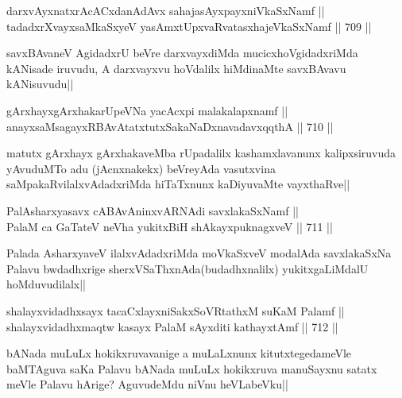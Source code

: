 \begin{shl}
darxvAyxnatxrAcACxdanAdAvx sahajasAyxpayxniVkaSxNamf || \\
tadadxrXvayxsaMkaSxyeV yasAmxtUpxvaRvatasxhajeVkaSxNamf ||  709 ||  
\end{shl}

\begin{artha}
savxBAvaneV AgidadxrU beVre darxvayxdiMda mucicxhoVgidadxriMda kANisade iruvudu, A darxvayxvu hoVdalilx hiMdinaMte savxBAvavu kANisuvudu||
\end{artha}


\begin{shl}
gArxhayxgArxhakarUpeVNa yacAcxpi malakalapxnamf || \\
anayxsaMsagayxRBAvAtatxtutxSakaNaDxnavadavxqqthA ||  710 ||  
\end{shl}

\begin{artha}
matutx gArxhayx gArxhakaveMba rUpadalilx kashamxlavanunx kalipxsiruvuda yAvuduMTo adu (jAcnxnakekx) beVreyAda vasutxvina saMpakaRvilalxvAdadxriMda hiTaTxnunx kaDiyuvaMte vayxthaRve||
\end{artha}


\begin{shl}
PalAsharxyasavx cABAvAninxvARNAdi savxlakaSxNamf || \\
PalaM ca GaTateV neVha yukitxBiH shAkayxpuknagxveV ||  711 ||  
\end{shl}

\begin{artha}
Palada AsharxyaveV ilalxvAdadxriMda moVkaSxveV modalAda savxlakaSxNa Palavu bwdadhxrige sherxVSaThxnAda(budadhxnalilx) yukitxgaLiMdalU hoMduvudilalx||
\end{artha}


\begin{shl}
shalayxvidadhxsayx tacaCxlayxniSakxSoVRtathxM suKaM Palamf || \\
shalayxvidadhxmaqtw kasayx PalaM sAyxditi kathayxtAmf ||  712 ||  
\end{shl}

\begin{artha}
bANada muLuLx hokikxruvavanige a muLaLxnunx kitutxtegedameVle baMTAguva saKa Palavu bANada muLuLx hokikxruva manuSayxnu satatx meVle Palavu hArige? AguvudeMdu niVnu heVLabeVku||
\end{artha}

